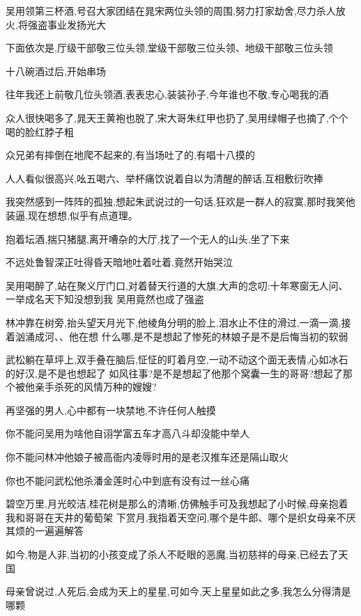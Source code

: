 ﻿\documentclass[12pt]{article}
\begin{document}
吴用领第三杯酒,号召大家团结在晁宋两位头领的周围,努力打家劫舍,尽力杀人放火,将强盗事业发扬光大\dldots

下面依次是,厅级干部敬三位头领,堂级干部敬三位头领、地级干部敬三位头领\dldots

十八碗酒过后,开始串场\dldots

往年我还上前敬几位头领酒,表表忠心,装装孙子,今年谁也不敬,专心喝我的酒\dldots

众人很快喝多了,晁天王黄袍也脱了,宋大哥朱红甲也扔了,吴用绿帽子也摘了,个个喝的脸红脖子粗

众兄弟有摔倒在地爬不起来的,有当场吐了的,有唱十八摸的\dldots

人人看似很高兴,吆五喝六、举杯痛饮\dldots 说着自以为清醒的醉话,互相敷衍吹捧\dldots

我突然感到一阵阵的孤独,想起朱武说过的一句话,狂欢是一群人的寂寞,那时我笑他装逼,现在想想,似乎有点道理。

抱着坛酒,揣只猪腿,离开嘈杂的大厅,找了一个无人的山头,坐了下来

不远处鲁智深正吐得昏天暗地\dldots 吐着吐着,竟然开始哭泣\dldots

吴用喝醉了,站在聚义厅门口,对着替天行道的大旗,大声的念叨:十年寒窗无人问、一举成名天下知\dldots 没想到我
吴用竟然也成了强盗\dldots

林冲靠在树旁,抬头望天\dldots 月光下,他棱角分明的脸上,泪水止不住的滑过,一滴一滴,接着汹涌成河、、他在想
什么哪,是不是想起了惨死的林娘子\dldots 是不是后悔当初的软弱\dldots

武松躺在草坪上,双手叠在脑后,怔怔的盯着月空,一动不动\dldots 这个面无表情,心如冰石的好汉,是不是也想起了
如风往事?\dldots 是不是想起了他那个窝囊一生的哥哥?想起了那个被他亲手杀死的风情万种的嫂嫂?

再坚强的男人,心中都有一块禁地,不许任何人触摸\dldots

你不能问吴用为啥他自诩学富五车才高八斗却没能中举人

你不能问林冲他娘子被高衙内凌辱时用的是老汉推车还是隔山取火

你也不能问武松他杀潘金莲时心中到底有没有过一丝心痛\dldots

碧空万里,月光皎洁,桂花树是那么的清晰,仿佛触手可及\dldots 我想起了小时候,母亲抱着我和哥哥在天井的葡萄架
下赏月,我指着天空问,哪个是牛郎、哪个是织女\dldots 母亲不厌其烦的一遍遍解答\dldots

如今,物是人非,当初的小孩变成了杀人不眨眼的恶魔,当初慈祥的母亲,已经去了天国\dldots

母亲曾说过,人死后,会成为天上的星星,可如今,天上星星如此之多,我怎么分得清是哪颗\dldots
\end{document}
